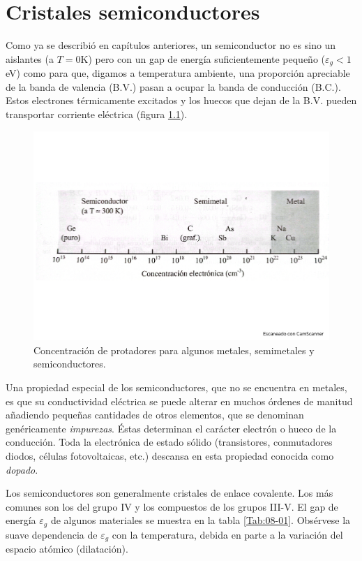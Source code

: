 \chapter{Cristales semiconductores} \label{Ch:09}

Como ya se describió en capítulos anteriores, un semiconductor no es sino un aislantes (a $T=0$K) pero con un gap de energía suficientemente pequeño ($\varepsilon_g <1$ eV) como para que, digamos a temperatura ambiente, una proporción apreciable de la banda de valencia (B.V.) pasan a ocupar la banda de conducción (B.C.). Estos electrones térmicamente excitados y los huecos que dejan de la B.V. pueden transportar corriente eléctrica (figura \ref{Fig:09-01}).


\begin{figure}[h!] \centering
	\includegraphics[scale=0.35]{Cuerpo/Ch_09/Fotos libro 1.pdf}
	\caption{Concentración de protadores para algunos metales, semimetales y semiconductores.}
	\label{Fig:09-01}
\end{figure}

Una propiedad especial de los semiconductores, que no se encuentra en metales, es que su conductividad eléctrica se puede alterar en muchos órdenes de manitud añadiendo pequeñas cantidades de otros elementos, que se denominan genéricamente \textit{impurezas}. Éstas determinan el carácter electrón o hueco de la conducción. Toda la electrónica de estado sólido (transistores, conmutadores diodos, células fotovoltaicas, etc.) descansa en esta propiedad conocida como \textit{dopado}.

Los semiconductores son generalmente cristales de enlace covalente. Los más comunes son los del grupo IV y los compuestos de los grupos III-V. El gap de energía $\varepsilon_g$ de algunos materiales se muestra en la tabla \ref{Tab:08-01}. Obsérvese la suave dependencia de $\varepsilon_g$ con la temperatura, debida en parte a la variación del espacio atómico (dilatación).

